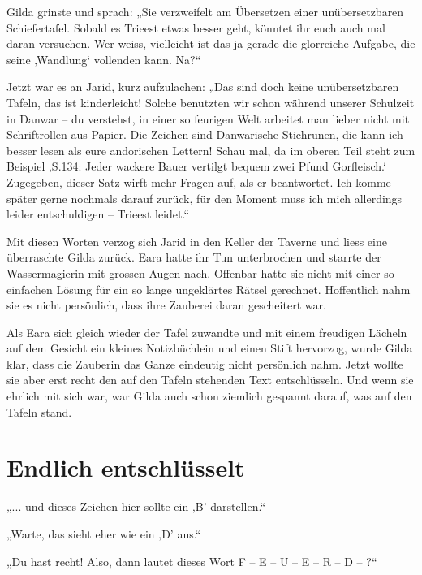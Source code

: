\documentclass[10pt, a4paper, oneside]{book}
\begin{document}
Gilda grinste und sprach: „Sie verzweifelt am Übersetzen einer unübersetzbaren Schiefertafel. Sobald es Trieest etwas besser geht, könntet ihr euch auch mal daran versuchen. Wer weiss, vielleicht ist das ja gerade die glorreiche Aufgabe, die seine ‚Wandlung‘ vollenden kann. Na?“

Jetzt war es an Jarid, kurz aufzulachen: „Das sind doch keine unübersetzbaren Tafeln, das ist kinderleicht! Solche benutzten wir schon während unserer Schulzeit in Danwar – du verstehst, in einer so feurigen Welt arbeitet man lieber nicht mit Schriftrollen aus Papier. Die Zeichen sind Danwarische Stichrunen, die kann ich besser lesen als eure andorischen Lettern! Schau mal, da im oberen Teil steht zum Beispiel ‚S.134: Jeder wackere Bauer vertilgt bequem zwei Pfund Gorfleisch.‘ Zugegeben, dieser Satz wirft mehr Fragen auf, als er beantwortet. Ich komme später gerne nochmals darauf zurück, für den Moment muss ich mich allerdings leider entschuldigen – Trieest leidet.“

Mit diesen Worten verzog sich Jarid in den Keller der Taverne und liess eine überraschte Gilda zurück. Eara hatte ihr Tun unterbrochen und starrte der Wassermagierin mit grossen Augen nach. Offenbar hatte sie nicht mit einer so einfachen Lösung für ein so lange ungeklärtes Rätsel gerechnet. Hoffentlich nahm sie es nicht persönlich, dass ihre Zauberei daran gescheitert war.

Als Eara sich gleich wieder der Tafel zuwandte und mit einem freudigen Lächeln auf dem Gesicht ein kleines Notizbüchlein und einen Stift hervorzog, wurde Gilda klar, dass die Zauberin das Ganze eindeutig nicht persönlich nahm. Jetzt wollte sie aber erst recht den auf den Tafeln stehenden Text entschlüsseln. Und wenn sie ehrlich mit sich war, war Gilda auch schon ziemlich gespannt darauf, was auf den Tafeln stand.








\newpage
\section{Endlich entschlüsselt}



„... und dieses Zeichen hier sollte ein ‚B’ darstellen.“

„Warte, das sieht eher wie ein ‚D’ aus.“

„Du hast recht! Also, dann lautet dieses Wort F – E – U – E – R – D – ?“
\end{document}
